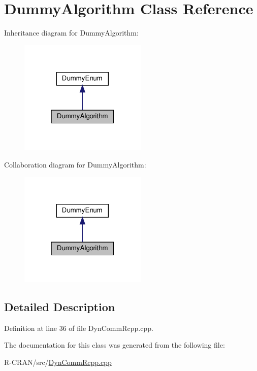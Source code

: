 \hypertarget{classDummyAlgorithm}{}\section{Dummy\+Algorithm Class Reference}
\label{classDummyAlgorithm}


Inheritance diagram for Dummy\+Algorithm\+:\nopagebreak
\begin{figure}[H]
\begin{center}
\leavevmode
\includegraphics[width=172pt]{classDummyAlgorithm__inherit__graph}
\end{center}
\end{figure}


Collaboration diagram for Dummy\+Algorithm\+:\nopagebreak
\begin{figure}[H]
\begin{center}
\leavevmode
\includegraphics[width=172pt]{classDummyAlgorithm__coll__graph}
\end{center}
\end{figure}


\subsection{Detailed Description}


Definition at line 36 of file Dyn\+Comm\+Rcpp.\+cpp.



The documentation for this class was generated from the following file\+:\begin{DoxyCompactItemize}
\item 
R-\/\+C\+R\+A\+N/src/\hyperlink{DynCommRcpp_8cpp}{Dyn\+Comm\+Rcpp.\+cpp}\end{DoxyCompactItemize}
